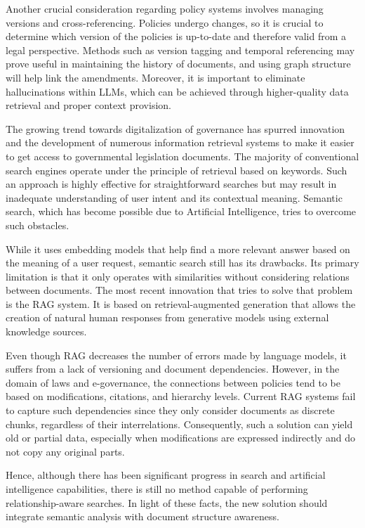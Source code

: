 \documentclass[conference]{IEEEtran}
\begin{document}
Another crucial consideration regarding policy systems involves managing versions and cross-referencing. Policies undergo changes, so it is crucial to determine which version of the policies is up-to-date and therefore valid from a legal perspective. Methods such as version tagging and temporal referencing may prove useful in maintaining the history of documents, and using graph structure will help link the amendments. Moreover, it is important to eliminate hallucinations within LLMs, which can be achieved through higher-quality data retrieval and proper context provision.

The growing trend towards digitalization of governance has spurred innovation and the development of numerous information retrieval systems to make it easier to get access to governmental legislation documents. The majority of conventional search engines operate under the principle of retrieval based on keywords. Such an approach is highly effective for straightforward searches but may result in inadequate understanding of user intent and its contextual meaning. Semantic search, which has become possible due to Artificial Intelligence, tries to overcome such obstacles.

While it uses embedding models that help find a more relevant answer based on the meaning of a user request, semantic search still has its drawbacks. Its primary limitation is that it only operates with similarities without considering relations between documents. The most recent innovation that tries to solve that problem is the RAG system. It is based on retrieval-augmented generation that allows the creation of natural human responses from generative models using external knowledge sources.

Even though RAG decreases the number of errors made by language models, it suffers from a lack of versioning and document dependencies. However, in the domain of laws and e-governance, the connections between policies tend to be based on modifications, citations, and hierarchy levels. Current RAG systems fail to capture such dependencies since they only consider documents as discrete chunks, regardless of their interrelations. Consequently, such a solution can yield old or partial data, especially when modifications are expressed indirectly and do not copy any original parts.

Hence, although there has been significant progress in search and artificial intelligence capabilities, there is still no method capable of performing relationship-aware searches. In light of these facts, the new solution should integrate semantic analysis with document structure awareness.
\end{document}
